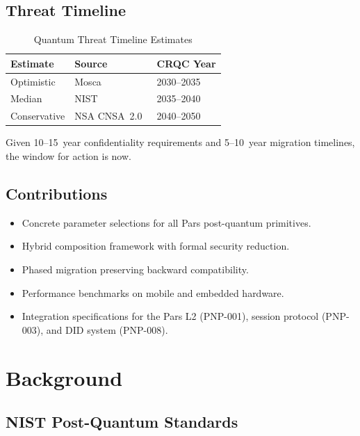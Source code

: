 \documentclass[11pt,a4paper]{article}
\begin{document}
\subsection{Threat Timeline}

\begin{table}[h]
\centering
\caption{Quantum Threat Timeline Estimates}
\label{tab:timeline}
\begin{tabular}{@{}lll@{}}
\toprule
\textbf{Estimate} & \textbf{Source} & \textbf{CRQC Year} \\
\midrule
Optimistic   & Mosca~\cite{mosca2018cybersecurity} & 2030--2035 \\
Median       & NIST~\cite{nist2016pqc}             & 2035--2040 \\
Conservative & NSA CNSA~2.0~\cite{nsa2022cnsa2}    & 2040--2050 \\
\bottomrule
\end{tabular}
\end{table}

Given 10--15~year confidentiality requirements and 5--10~year migration
timelines, the window for action is now.

\subsection{Contributions}

\begin{itemize}
    \item Concrete parameter selections for all Pars post-quantum
    primitives.
    \item Hybrid composition framework with formal security reduction.
    \item Phased migration preserving backward compatibility.
    \item Performance benchmarks on mobile and embedded hardware.
    \item Integration specifications for the Pars L2 (PNP-001), session
    protocol (PNP-003), and DID system (PNP-008).
\end{itemize}

\section{Background}
\label{sec:background}

\subsection{NIST Post-Quantum Standards}
\end{document}
